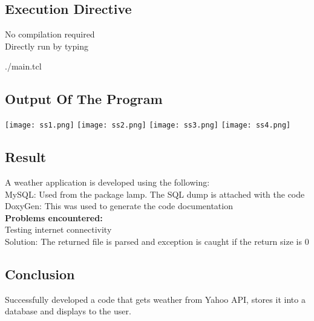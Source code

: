 \documentclass[paper=a4, fontsize=11pt]{scrartcl} %
\numberwithin{equation}{section} %
\numberwithin{figure}{section} %
\numberwithin{table}{section} %
\begin{document}
\subsection{Execution Directive}
No compilation required\\
Directly run by typing

./main.tcl\\

\subsection{Output Of The Program}
 {\center\texttt{[image: ss1.png]}}
 {\center\texttt{[image: ss2.png]}}
 {\center\texttt{[image: ss3.png]}}
 {\center\texttt{[image: ss4.png]}}

\subsection{Result}
A weather application is developed using the following:\\
MySQL: Used from the package lamp. The SQL dump is attached with the code\\
DoxyGen: This was used to generate the code documentation\\

\textbf{Problems encountered:}\\
Testing internet connectivity\\
Solution: The returned file is parsed and exception is caught if the return size is 0\\


\subsection{Conclusion}
Successfully developed a code that gets weather from Yahoo API, stores it into a database and displays to the user.
\end{document}
